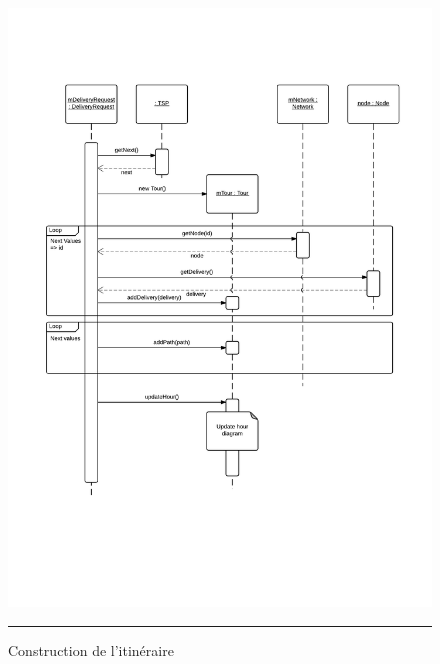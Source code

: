 \begin{figure}[H]
	\centering
		\includegraphics[width=\textwidth,height=\textheight,keepaspectratio]{Figures/calcul_tournee4}
		\rule{35em}{0.5pt}
	\caption[Construction de l'itinéraire]{Construction de l'itinéraire}
\end{figure}

